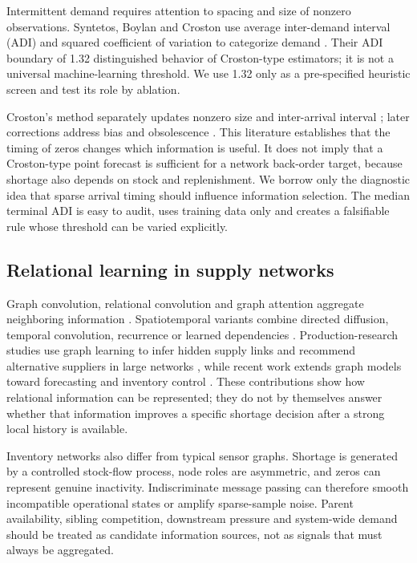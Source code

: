 \documentclass[11pt,a4paper]{article}
\begin{document}
Intermittent demand requires attention to spacing and size of nonzero observations. Syntetos, Boylan and Croston use average inter-demand interval (ADI) and squared coefficient of variation to categorize demand \cite{syntetos}. Their ADI boundary of 1.32 distinguished behavior of Croston-type estimators; it is not a universal machine-learning threshold. We use 1.32 only as a pre-specified heuristic screen and test its role by ablation.

Croston's method separately updates nonzero size and inter-arrival interval \cite{croston}; later corrections address bias and obsolescence \cite{sba,tsb}. This literature establishes that the timing of zeros changes which information is useful. It does not imply that a Croston-type point forecast is sufficient for a network back-order target, because shortage also depends on stock and replenishment. We borrow only the diagnostic idea that sparse arrival timing should influence information selection. The median terminal ADI is easy to audit, uses training data only and creates a falsifiable rule whose threshold can be varied explicitly.

\subsection{Relational learning in supply networks}
Graph convolution, relational convolution and graph attention aggregate neighboring information \cite{gcn,rgcn,gat}. Spatiotemporal variants combine directed diffusion, temporal convolution, recurrence or learned dependencies \cite{dcrnn,stgcn,graphwavenet,mtgnn}. Production-research studies use graph learning to infer hidden supply links and recommend alternative suppliers in large networks \cite{kosasih,tu}, while recent work extends graph models toward forecasting and inventory control \cite{chang,kotecha}. These contributions show how relational information can be represented; they do not by themselves answer whether that information improves a specific shortage decision after a strong local history is available.

Inventory networks also differ from typical sensor graphs. Shortage is generated by a controlled stock-flow process, node roles are asymmetric, and zeros can represent genuine inactivity. Indiscriminate message passing can therefore smooth incompatible operational states or amplify sparse-sample noise. Parent availability, sibling competition, downstream pressure and system-wide demand should be treated as candidate information sources, not as signals that must always be aggregated.
\end{document}
